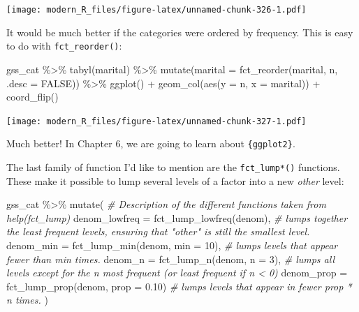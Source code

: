 \documentclass[
]{article}
\newenvironment{Shaded}{\begin{snugshade}}{\end{snugshade}}
\newcommand{\AttributeTok}[1]{\textcolor[rgb]{0.77,0.63,0.00}{#1}}
\newcommand{\CommentTok}[1]{\textcolor[rgb]{0.56,0.35,0.01}{\textit{#1}}}
\newcommand{\ConstantTok}[1]{\textcolor[rgb]{0.00,0.00,0.00}{#1}}
\newcommand{\DecValTok}[1]{\textcolor[rgb]{0.00,0.00,0.81}{#1}}
\newcommand{\FloatTok}[1]{\textcolor[rgb]{0.00,0.00,0.81}{#1}}
\newcommand{\FunctionTok}[1]{\textcolor[rgb]{0.00,0.00,0.00}{#1}}
\newcommand{\NormalTok}[1]{#1}
\newcommand{\SpecialCharTok}[1]{\textcolor[rgb]{0.00,0.00,0.00}{#1}}
\begin{document}
\texttt{[image: modern\_R\_files/figure-latex/unnamed-chunk-326-1.pdf]}

It would be much better if the categories were ordered by frequency. This is easy to do with
\texttt{fct\_reorder()}:

\begin{Shaded}
\begin{Highlighting}[]
\NormalTok{gss\_cat }\SpecialCharTok{\%\textgreater{}\%}
    \FunctionTok{tabyl}\NormalTok{(marital) }\SpecialCharTok{\%\textgreater{}\%}
    \FunctionTok{mutate}\NormalTok{(}\AttributeTok{marital =} \FunctionTok{fct\_reorder}\NormalTok{(marital, n, }\AttributeTok{.desc =} \ConstantTok{FALSE}\NormalTok{)) }\SpecialCharTok{\%\textgreater{}\%}
    \FunctionTok{ggplot}\NormalTok{() }\SpecialCharTok{+}
    \FunctionTok{geom\_col}\NormalTok{(}\FunctionTok{aes}\NormalTok{(}\AttributeTok{y =}\NormalTok{ n, }\AttributeTok{x =}\NormalTok{ marital)) }\SpecialCharTok{+}
    \FunctionTok{coord\_flip}\NormalTok{()}
\end{Highlighting}
\end{Shaded}

\texttt{[image: modern\_R\_files/figure-latex/unnamed-chunk-327-1.pdf]}

Much better! In Chapter 6, we are going to learn about \texttt{\{ggplot2\}}.

The last family of function I'd like to mention are the \texttt{fct\_lump*()} functions. These make it possible
to lump several levels of a factor into a new \emph{other} level:

\begin{Shaded}
\begin{Highlighting}[]
\NormalTok{gss\_cat }\SpecialCharTok{\%\textgreater{}\%}
  \FunctionTok{mutate}\NormalTok{(}
    \CommentTok{\# Description of the different functions taken from help(fct\_lump)}
    \AttributeTok{denom\_lowfreq =} \FunctionTok{fct\_lump\_lowfreq}\NormalTok{(denom), }\CommentTok{\# lumps together the least frequent levels, ensuring that "other" is still the smallest level.}
    \AttributeTok{denom\_min =} \FunctionTok{fct\_lump\_min}\NormalTok{(denom, }\AttributeTok{min =} \DecValTok{10}\NormalTok{), }\CommentTok{\# lumps levels that appear fewer than min times.}
    \AttributeTok{denom\_n =} \FunctionTok{fct\_lump\_n}\NormalTok{(denom, }\AttributeTok{n =} \DecValTok{3}\NormalTok{), }\CommentTok{\# lumps all levels except for the n most frequent (or least frequent if n \textless{} 0)}
    \AttributeTok{denom\_prop =} \FunctionTok{fct\_lump\_prop}\NormalTok{(denom, }\AttributeTok{prop =} \FloatTok{0.10}\NormalTok{) }\CommentTok{\# lumps levels that appear in fewer prop * n times.}
\NormalTok{         )}
\end{Highlighting}
\end{Shaded}
\end{document}
